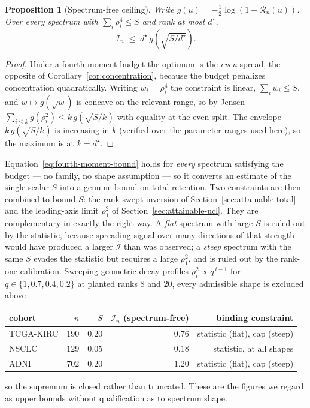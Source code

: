 \documentclass{article}
\newtheorem{proposition}{Proposition}
\begin{document}
\begin{proposition}[Spectrum-free ceiling]
\label{prop:fourth-moment}
Write $g(u) = -\tfrac12\log(1-\mathcal{R}_n(u))$. Over every spectrum with
$\sum_i\rho_i^4 \le S$ and rank at most $d^\star$,
\begin{equation}
\boxed{\;\mathcal{I}_n \;\le\; d^\star\, g\!\left(\sqrt{S/d^\star}\right).\;}
\label{eq:fourth-moment-bound}
\end{equation}
\end{proposition}

\begin{proof}
Under a fourth-moment budget the optimum is the \emph{even} spread, the
opposite of Corollary~\ref{cor:concentration}, because the budget penalizes
concentration quadratically. Writing $w_i=\rho_i^4$ the constraint is linear,
$\sum_i w_i\le S$, and $w\mapsto g(\sqrt{w})$ is concave on the relevant range,
so by Jensen $\sum_{i\le k} g(\rho_i^2) \le k\,g(\sqrt{S/k})$ with equality at
the even split. The envelope $k\,g(\sqrt{S/k})$ is increasing in $k$ (verified
over the parameter ranges used here), so the maximum is at $k=d^\star$.
\end{proof}

Equation~\eqref{eq:fourth-moment-bound} holds for \emph{every} spectrum
satisfying the budget --- no family, no shape assumption --- so it converts an
estimate of the single scalar $S$ into a genuine bound on total retention. Two
constraints are then combined to bound $S$: the rank-swept inversion of
Section~\ref{sec:attainable-total} and the leading-axis limit $\bar\rho_1^2$ of
Section~\ref{sec:attainable-ucl}. They are complementary in exactly the right
way. A \emph{flat} spectrum with large $S$ is ruled out by the statistic,
because spreading signal over many directions of that strength would have
produced a larger $\hat{\mathcal{I}}$ than was observed; a \emph{steep} spectrum
with the same $S$ evades the statistic but requires a large $\rho_1^2$, and is
ruled out by the rank-one calibration. Sweeping geometric decay profiles
$\rho_i^2\propto q^{\,i-1}$ for $q\in\{1,0.7,0.4,0.2\}$ at planted ranks $8$ and
$20$, every admissible shape is excluded above
\begin{center}
\begin{tabular}{lrrrr}
\toprule
cohort & $n$ & $\bar S$ & $\bar{\mathcal{I}}_n$ (spectrum-free) & binding constraint\\
\midrule
TCGA-KIRC & $190$ & $0.20$ & $0.76$ & statistic (flat), cap (steep)\\
NSCLC     & $129$ & $0.05$ & $0.18$ & statistic, at all shapes\\
ADNI      & $702$ & $0.20$ & $1.20$ & statistic (flat), cap (steep)\\
\bottomrule
\end{tabular}
\end{center}
so the supremum is closed rather than truncated. These are the figures we regard
as upper bounds without qualification as to spectrum shape.
\end{document}
